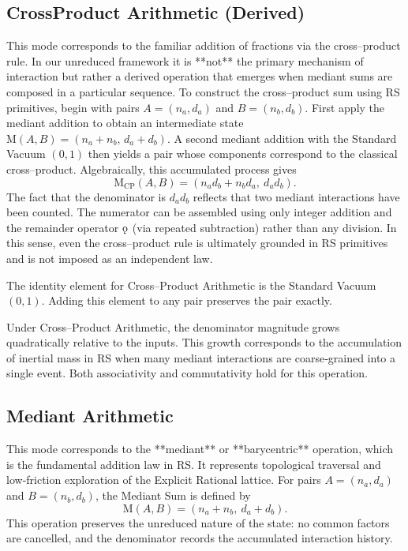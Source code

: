 \documentclass[11pt, letterpaper]{article}
\newcommand{\MedAdd}{\mathrm{M}}
\newcommand{\koppa}{\mathbin{\text{\rm\k{o}}}}
\begin{document}
\subsection{Cross\textendash Product Arithmetic (Derived)}
This mode corresponds to the familiar addition of fractions via the cross–product rule.  In our unreduced framework it is **not** the primary mechanism of interaction but rather a derived operation that emerges when mediant sums are composed in a particular sequence.  To construct the cross–product sum using RS primitives, begin with pairs $A=(n_a,d_a)$ and $B=(n_b,d_b)$.  First apply the mediant addition to obtain an intermediate state $\MedAdd(A,B)=(n_a+n_b,\,d_a+d_b)$.  A second mediant addition with the Standard Vacuum $(0,1)$ then yields a pair whose components correspond to the classical cross–product.  Algebraically, this accumulated process gives
\[
    \MedAdd_{\mathrm{CP}}(A,B) = (n_a d_b + n_b d_a,\ d_a d_b).
\]
The fact that the denominator is $d_a d_b$ reflects that two mediant interactions have been counted.  The numerator can be assembled using only integer addition and the remainder operator $\koppa$ (via repeated subtraction) rather than any division.  In this sense, even the cross–product rule is ultimately grounded in RS primitives and is not imposed as an independent law.

The identity element for Cross–Product Arithmetic is the Standard Vacuum $(0,1)$.  Adding this element to any pair preserves the pair exactly.

Under Cross–Product Arithmetic, the denominator magnitude grows quadratically relative to the inputs.  This growth corresponds to the accumulation of inertial mass in RS when many mediant interactions are coarse‑grained into a single event.  Both associativity and commutativity hold for this operation.

\subsection{Mediant Arithmetic}
This mode corresponds to the **mediant** or **barycentric** operation, which is the fundamental addition law in RS.  It represents topological traversal and low‑friction exploration of the Explicit Rational lattice.  For pairs $A=(n_a,d_a)$ and $B=(n_b,d_b)$, the Mediant Sum is defined by
\[
    \MedAdd(A,B) = (n_a + n_b,\ d_a + d_b).
\]
This operation preserves the unreduced nature of the state: no common factors are cancelled, and the denominator records the accumulated interaction history.
\end{document}
